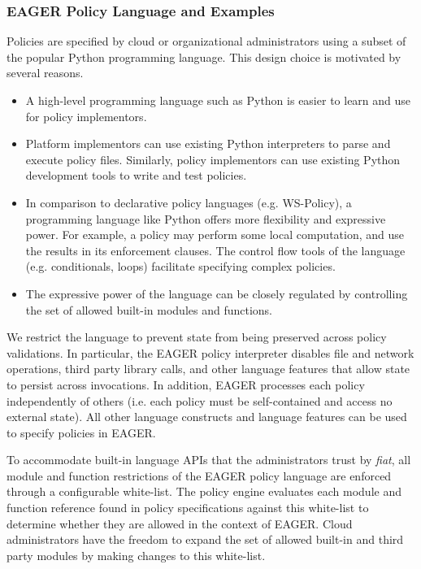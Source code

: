 \subsubsection{EAGER Policy Language and Examples}
\label{sec:policy-lang}
Policies are specified by cloud
or organizational administrators using a subset of the popular 
Python programming language.
This design choice is motivated by several reasons.
\begin{itemize}
\item A high-level programming language such as Python is easier to learn and use
for policy implementors. 
\item Platform implementors can use existing Python interpreters to parse
and execute policy files. Similarly, policy implementors can use existing Python
development tools to write and test policies.
\item In comparison to declarative policy languages (e.g. WS-Policy),
a programming language like Python offers more flexibility and expressive power.
For example, a policy may perform some local computation, and use the results
in its enforcement clauses. The control flow tools of the language (e.g. conditionals, loops) 
facilitate specifying complex policies.
\item The expressive power of the language can be closely regulated by controlling
the set of allowed built-in modules and functions.
\end{itemize}

We restrict the language to prevent state from being preserved across
policy validations. In particular, the EAGER policy interpreter disables 
file and network operations, third party library calls, 
and other language features that allow
state to persist across invocations.  
In addition, EAGER processes each 
policy independently of others (i.e. each policy must be self-contained and 
access no external state).  All other language constructs and 
language features can be used to specify policies in EAGER.

To accommodate built-in language APIs that the administrators trust by {\em fiat},
all module and function restrictions of the EAGER policy language are enforced
through a configurable white-list. The policy engine evaluates each module and function
reference found in policy specifications
against this white-list to determine whether they are allowed in the context of
EAGER. Cloud administrators have the freedom
to expand the set of allowed built-in and third party modules by making
changes to this white-list.

